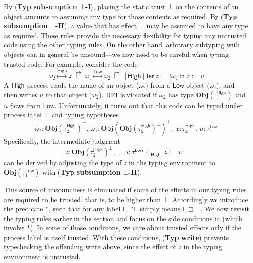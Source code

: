 \documentclass{sigplanconf}
\newcommand{\lab}{\mathsf L}
\newcommand{\eval}[3]{\mathsf{let}~#1=#2~\mathsf{in}~#3}
\newcommand{\store}[1]{\stackrel{#1}\mapsto}
\newcommand{\trule}[1]{(\textbf{Typ #1})}
\begin{document}
\noindent
By \trule{subsumption $\bot$-I}, placing the static trust $\bot$ on the contents of an object amounts to assuming any type for those contents as required. By \trule{subsumption $\bot$-II}, a value that has effect $\bot$ may be assumed to have any type as required. These rules provide the necessary flexibility for typing any untrusted code using the other typing rules. On the other hand, arbitrary subtyping with objects can in general be unsound---we now need to be careful when typing trusted code. For example, consider the code
$$\omega_2\store{\mathsf{High}}x~\Rsh~\omega_1\store{\mathsf{Low}}\omega_2~\Rsh~[\mathsf{High}]~\eval z {\:!\omega_1}{z := u}$$
A $\mathsf{High}$-process reads the name of an object ($\omega_2$) from a $\mathsf{Low}$-object ($\omega_1$), and then writes $u$ to that object ($\omega_2$). DFI is violated if $\omega_2$ has type $\mathbf{Obj}(\_^{\mathsf{High}})$ and $u$ flows from $\mathsf{Low}$. Unfortunately, it turns out that this code can be typed under process label $\top$ and typing hypotheses
$$\omega_2 : \mathbf{Obj}(\tau_2^{\mathsf{High}})^{\top}\!,~\omega_1 : \mathbf{Obj}(\mathbf{Obj}(\tau_2^{\mathsf{High}})^\bot)^{\top}\!,~x : \tau_2^{\mathsf{High}},~u : \tau_1^{\mathsf{Low}}$$ 
Specifically, the intermediate judgment
$$z : \mathbf{Obj}(\tau_2^{\mathsf{High}})^\bot, \dots, u : \tau_1^{\mathsf{Low}} ~\vdash_{\mathsf{High}}~ z := u : \_$$
can be derived by adjusting the type of $z$ in the typing environment to $\mathbf{Obj}(\tau_1^{\mathsf{Low}})$ with \trule{subsumption $\bot$-II}. 

This source of unsoundness is eliminated if some of the effects in our typing rules are required to be trusted, that is, to be higher than $\bot$. Accordingly we introduce the predicate $\ast$, such that for any label $\lab$, $\ast \lab$ simply means $\lab \sqsupset \bot$. We now revisit the typing rules earlier in the section and focus on the side conditions in  (which involve $\ast$). In some of those conditions, we care about trusted effects only if the process label is itself trusted. With these conditions, \trule{write} prevents typechecking the offending write above, since the effect of $z$ in the typing environment is untrusted.
\end{document}
